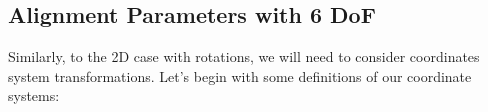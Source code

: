 \documentclass[a4paper,11pt]{article}
\begin{document}








\subsection{Alignment Parameters with 6 DoF}

Similarly, to the 2D case with rotations, we will need to consider coordinates system transformations. Let's begin with some definitions of our coordinate systems: 
\end{document}
